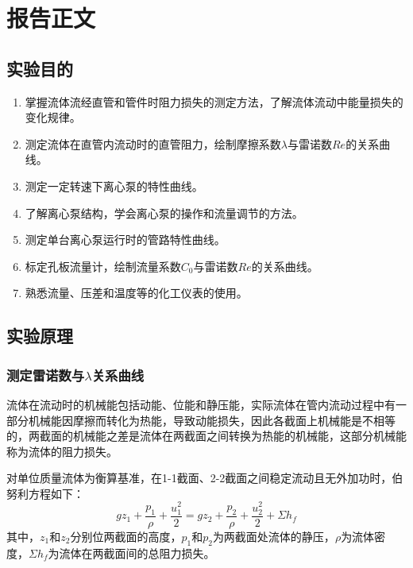 \documentclass[a4paper,UTF8]{ctexrep}
\theoremstyle{plain}
\theoremstyle{definition}
\numberwithin{equation}{chapter}
\begin{document}
	
	

        \chapter{报告正文}
	\section{实验目的}
	\begin{enumerate}
		\item 掌握流体流经直管和管件时阻力损失的测定方法，了解流体流动中能量损失的变化规律。
            
            \item 测定流体在直管内流动时的直管阻力，绘制摩擦系数$\lambda$与雷诺数$Re$的关系曲线。
            \item 测定一定转速下离心泵的特性曲线。
            \item 了解离心泵结构，学会离心泵的操作和流量调节的方法。
            \item 测定单台离心泵运行时的管路特性曲线。
            \item 标定孔板流量计，绘制流量系数$C_0$与雷诺数$Re$的关系曲线。
            \item 熟悉流量、压差和温度等的化工仪表的使用。
	\end{enumerate}

        \section{实验原理}
        \subsection{测定雷诺数与$\lambda$关系曲线}
        流体在流动时的机械能包括动能、位能和静压能，实际流体在管内流动过程中有一部分机械能因摩擦而转化为热能，导致动能损失，因此各截面上机械能是不相等的，两截面的机械能之差是流体在两截面之间转换为热能的机械能，这部分机械能称为流体的阻力损失。

对单位质量流体为衡算基准，在1-1截面、2-2截面之间稳定流动且无外加功时，伯努利方程如下：
\begin{equation}
    gz_1+\frac{p_1}{\rho}+\frac{u_1^2}{2}=gz_2+\frac{p_2}{\rho}+\frac{u_2^2}{2}+\Sigma h_f
\end{equation}
其中，$z_1$和$z_2$分别位两截面的高度，$p_1$和$p_2$为两截面处流体的静压，$\rho$为流体密度，$\Sigma h_f$为流体在两截面间的总阻力损失。
\end{document}
